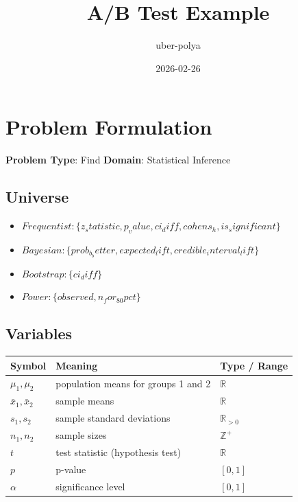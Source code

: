 \documentclass[11pt, a4paper]{article}
\title{A/B Test Example}
\author{uber-polya}
\date{2026-02-26}
\begin{document}
\maketitle
\tableofcontents
\newpage

\section{Problem Formulation}

\begin{polyamodel}

\textbf{Problem Type}: Find \hfill
\textbf{Domain}: Statistical Inference


\end{polyamodel}

\subsection{Universe}

\begin{itemize}
  \item $Frequentist: \{z_statistic, p_value, ci_diff, cohens_h, is_significant\}$
  \item $Bayesian: \{prob_b_better, expected_lift, credible_interval_lift\}$
  \item $Bootstrap: \{ci_diff\}$
  \item $Power: \{observed, n_for_80pct\}$
\end{itemize}

\subsection{Variables}

\begin{longtable}{lll}
\toprule
\textbf{Symbol} & \textbf{Meaning} & \textbf{Type / Range} \\
\midrule
\endhead
$\mu_1, \mu_2$ & population means for groups 1 and 2 & $\mathbb{{R}}$ \\
$\bar{{x}}_1, \bar{{x}}_2$ & sample means & $\mathbb{{R}}$ \\
$s_1, s_2$ & sample standard deviations & $\mathbb{{R}}_{{>0}}$ \\
$n_1, n_2$ & sample sizes & $\mathbb{{Z}}^+$ \\
$t$ & test statistic (hypothesis test) & $\mathbb{{R}}$ \\
$p$ & p-value & $[0, 1]$ \\
$\alpha$ & significance level & $[0, 1]$ \\
\bottomrule
\end{longtable}
\end{document}
